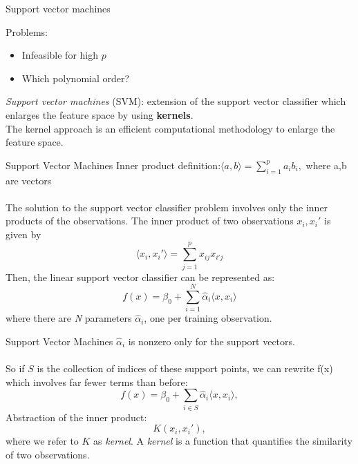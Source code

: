 \documentclass[notes]{beamer}          %
\begin{document}
\begin{frame}{Support vector machines}

Problems:
\begin{itemize}
	\item Infeasible for high $p$
	\item Which polynomial order?
\end{itemize}
\vspace{0.5cm}
\textit{Support vector machines} (SVM): extension of the support vector classifier which enlarges the feature space by using \textbf{kernels}.\\
\vspace{0.5cm}
The kernel approach is an efficient computational methodology to enlarge the feature space.


\end{frame}

\begin{frame}{Support Vector Machines}
Inner product definition:$\langle {a,b} \rangle = \sum_{i=1}^{p} a_{i}b_{i},$ where a,b are vectors\\~\\
The solution to the support vector classifier problem involves only the inner products of the observations. The inner product of two observations $x_i, x_i'$ is given by
\begin{equation*}
\langle {x_i,x_i'} \rangle = \sum_{j=1}^{p} x_{ij} x_{i'j}
\end{equation*}
Then, the linear support vector classifier can be represented as:
\begin{equation*}
f(x) = \beta_0 + \sum_{i=1}^{N} \hat \alpha_i \langle {x,x_i} \rangle
\end{equation*}
where there are \textit{N} parameters $\hat \alpha_i$, one per training observation.
\end{frame}

%


\begin{frame}{Support Vector Machines}
$\hat{\alpha}_i$ is nonzero only for the support vectors. \\~\\
So if $\mathit{S}$ is the collection of indices of these support points, we can rewrite f(x) which involves far fewer terms than before:
\begin{equation*}
f(x) = \beta_0 + \sum_{i\in\mathit{S}} \hat{\alpha}_i \langle {x,x_i} \rangle,
\end{equation*}
Abstraction of the inner product:
\begin{equation*}
\mathit{K}(x_i,x_i'),
\end{equation*}
where we refer to $\mathit{K}$ as \textit{kernel}. 
A \textit{kernel} is a function that quantifies the similarity of two observations.
\end{frame}
\end{document}
